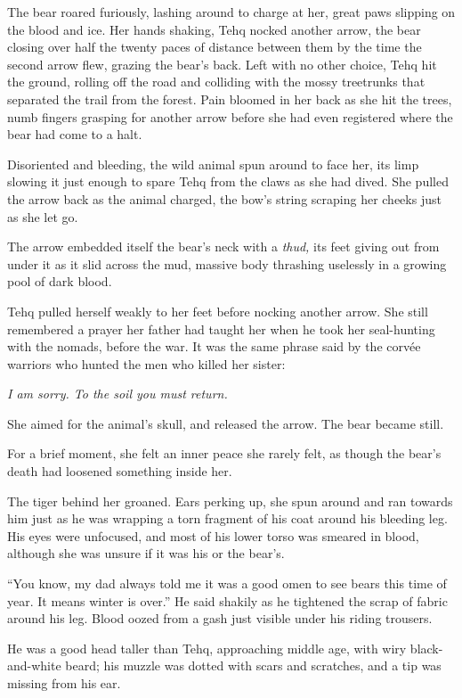 The bear roared furiously, lashing around to charge at her, great paws slipping on the blood and ice. Her hands shaking, Tehq nocked another arrow, the bear closing over half the twenty paces of distance between them by the time the second arrow flew, grazing the bear's back. Left with no other choice, Tehq hit the ground, rolling off the road and colliding with the mossy treetrunks that separated the trail from the forest. Pain bloomed in her back as she hit the trees, numb fingers grasping for another arrow before she had even registered where the bear had come to a halt.

Disoriented and bleeding, the wild animal spun around to face her, its limp slowing it just enough to spare Tehq from the claws as she had dived. She pulled the arrow back as the animal charged, the bow's string scraping her cheeks just as she let go.

The arrow embedded itself the bear's neck with a \emph{thud,} its feet giving out from under it as it slid across the mud, massive body thrashing uselessly in a growing pool of dark blood.

Tehq pulled herself weakly to her feet before nocking another arrow. She still remembered a prayer her father had taught her when he took her seal-hunting with the nomads, before the war. It was the same phrase said by the corvée warriors who hunted the men who killed her sister:

\emph{I am sorry. To the soil you must return.}

She aimed for the animal's skull, and released the arrow. The bear became still.

For a brief moment, she felt an inner peace she rarely felt, as though the bear's death had loosened something inside her.

The tiger behind her groaned. Ears perking up, she spun around and ran towards him just as he was wrapping a torn fragment of his coat around his bleeding leg. His eyes were unfocused, and most of his lower torso was smeared in blood, although she was unsure if it was his or the bear's.

``You know, my dad always told me it was a good omen to see bears this time of year. It means winter is over.'' He said shakily as he tightened the scrap of fabric around his leg. Blood oozed from a gash just visible under his riding trousers.

He was a good head taller than Tehq, approaching middle age, with wiry black-and-white beard; his muzzle was dotted with scars and scratches, and a tip was missing from his ear.

